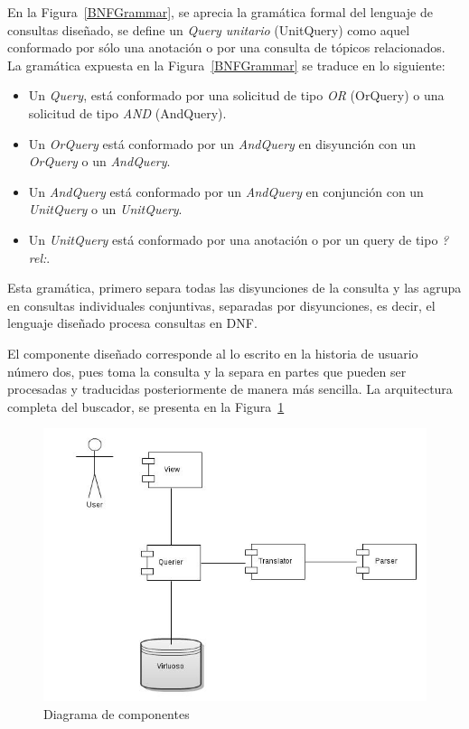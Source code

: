 \begin{itemize}
En la Figura~\ref{BNFGrammar}, se aprecia la gramática formal del lenguaje de consultas diseñado, se define un \textit{Query unitario} (UnitQuery) como aquel conformado por sólo una anotación o por una consulta de tópicos relacionados. La gramática expuesta en la Figura~\ref{BNFGrammar} se traduce en lo siguiente:

\begin{itemize}
    \item Un \textit{Query}, está conformado por una solicitud de tipo \textit{OR} (OrQuery) o una solicitud de tipo \textit{AND} (AndQuery).
    \item Un \textit{OrQuery} está conformado por un \textit{AndQuery} en disyunción con un \textit{OrQuery} o un \textit{AndQuery}.
    \item Un \textit{AndQuery} está conformado por un \textit{AndQuery} en conjunción con un \textit{UnitQuery} o un \textit{UnitQuery}.
    \item Un \textit{UnitQuery} está conformado por una anotación o por un query de tipo \textit{?rel:}.
\end{itemize}

Esta gramática, primero separa todas las disyunciones de la consulta y las agrupa en consultas individuales conjuntivas, separadas por disyunciones, es decir, el lenguaje diseñado procesa consultas en DNF.

El componente diseñado corresponde al lo escrito en la historia de usuario número dos, pues toma la consulta y la separa en partes que pueden ser procesadas y traducidas posteriormente de manera más sencilla. La arquitectura completa del buscador, se presenta en la Figura~\ref{searcher_architecture}

\begin{figure}[!h]
    \begin{center}
        \includegraphics[scale=0.45]{images/searcher_components.jpg}
        \caption{Diagrama de componentes}
        \label{searcher_architecture}
    \end{center}
\end{figure}


\end{itemize}
